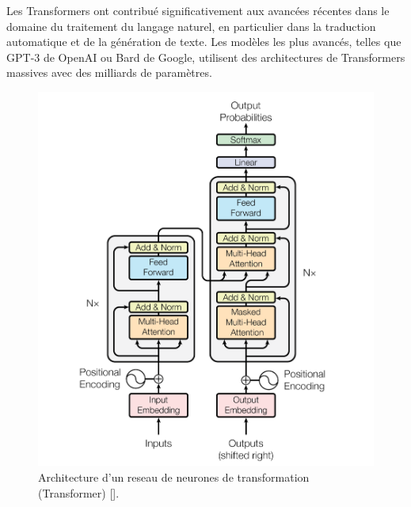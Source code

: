 \medskip
Les Transformers ont contribué significativement aux avancées récentes dans le domaine du traitement du langage naturel, en particulier dans la traduction automatique et de la génération de texte. Les modèles les plus avancés, telles que GPT-3 de OpenAI ou Bard de Google, utilisent des architectures de Transformers massives avec des milliards de paramètres.

\begin{figure}[hbt!]
	\centering
	\includegraphics[width=12cm]{images_pfe/transformer-architecture.png}
	\caption{Architecture d'un reseau de neurones de transformation (Transformer) [\cite{attention_is_all_you_need}].}
	\label{fig:gan}
\end{figure}
\FloatBarrier

